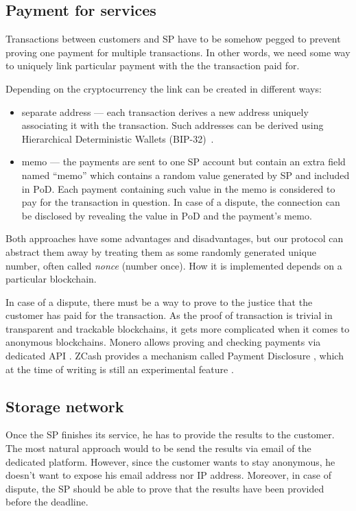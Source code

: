 \documentclass{ieeeaccess}
\begin{document}
\subsection{Payment for services}\label{payment-for-services}
Transactions between customers and SP have to be somehow pegged to prevent proving one payment for multiple transactions. In other
words, we need some way to uniquely link particular payment with the
the transaction paid for.

Depending on the cryptocurrency the link can be created in different
ways:

\begin{itemize}

\item
  separate address — each transaction derives a new address uniquely
  associating it with the transaction. Such addresses can be derived
  using Hierarchical Deterministic Wallets (BIP-32)~\cite{bipsbip089}.
\item
  memo — the payments are sent to one SP account but contain an extra
  field named ``memo'' which contains a random value generated by SP and
  included in $\mathrm{PoD}$. Each payment containing such value in the memo is
  considered to pay for the transaction in question. In case of a dispute,
  the connection can be disclosed by revealing the value in $\mathrm{PoD}$ and the payment's memo.
\end{itemize}

Both approaches have some advantages and disadvantages, but our protocol can abstract them away by treating them as some randomly generated unique number, often called \textit{nonce} (number once). How it is implemented depends on a particular blockchain.

In case of a dispute, there must be a way to prove to the justice that the customer has paid for the transaction. As the proof of transaction is trivial in transparent and trackable blockchains, it gets more complicated when it comes to anonymous blockchains. Monero allows proving and checking payments via dedicated API \cite{Howtopro46}. ZCash provides a mechanism called Payment Disclosure \cite{AnIntrod25}, which at the time of writing is still an experimental feature
\cite{paymentd11}.

\subsection{Storage network}\label{storage-network}
Once the SP finishes its service, he has to provide the results to the customer. The most natural approach would to be send the results via email of the dedicated platform. However, since the customer wants to stay anonymous, he doesn't want to expose his email address nor IP address. Moreover, in case of dispute, the SP should be able to prove that the results have been provided before the deadline.
\end{document}
